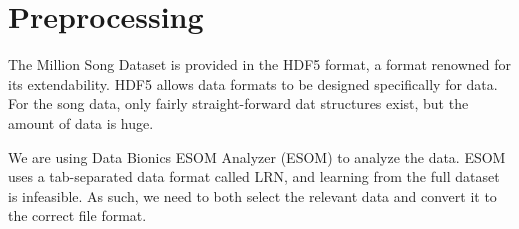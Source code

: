 
\section{Preprocessing} %
\label{sec:preprocessing}

The Million Song Dataset is provided in the HDF5 format, a format renowned for its extendability. HDF5
allows data formats to be designed specifically for data. \citep{hdfgrp} For the song data, only fairly straight-forward dat
structures exist, but the amount of data is huge.

We are using Data Bionics ESOM Analyzer (ESOM) to analyze the data. ESOM uses a tab-separated data format called LRN, and learning
from the full dataset is infeasible. As such, we need to both select the relevant data and convert it to the correct file format.


